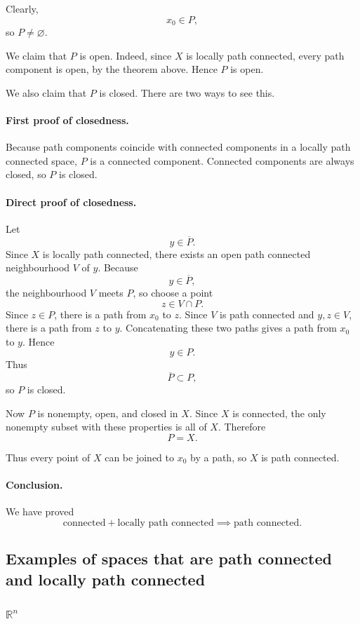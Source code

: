 \documentclass[12pt,a4paper]{article}
\theoremstyle{notespace}
\begin{document}
Clearly,
\[
x_0\in P,
\]
so \(P\neq \varnothing\).

We claim that \(P\) is open. Indeed, since \(X\) is locally path connected, every path component is open, by the theorem above. Hence \(P\) is open.

We also claim that \(P\) is closed. There are two ways to see this.

\paragraph{First proof of closedness.}
Because path components coincide with connected components in a locally path connected space, \(P\) is a connected component. Connected components are always closed, so \(P\) is closed.

\paragraph{Direct proof of closedness.}
Let
\[
y\in \overline{P}.
\]
Since \(X\) is locally path connected, there exists an open path connected neighbourhood \(V\) of \(y\). Because
\[
y\in \overline{P},
\]
the neighbourhood \(V\) meets \(P\), so choose a point
\[
z\in V\cap P.
\]
Since \(z\in P\), there is a path from \(x_0\) to \(z\). Since \(V\) is path connected and \(y,z\in V\), there is a path from \(z\) to \(y\). Concatenating these two paths gives a path from \(x_0\) to \(y\). Hence
\[
y\in P.
\]
Thus
\[
\overline{P}\subset P,
\]
so \(P\) is closed.

Now \(P\) is nonempty, open, and closed in \(X\). Since \(X\) is connected, the only nonempty subset with these properties is all of \(X\). Therefore
\[
P=X.
\]

Thus every point of \(X\) can be joined to \(x_0\) by a path, so \(X\) is path connected.

\paragraph{Conclusion.}
We have proved
\[
\text{connected}+\text{locally path connected}\implies \text{path connected}.
\]

\subsection{Examples of spaces that are path connected and locally path connected}

\subsubsection{\(\mathbb{R}^n\)}
\end{document}
